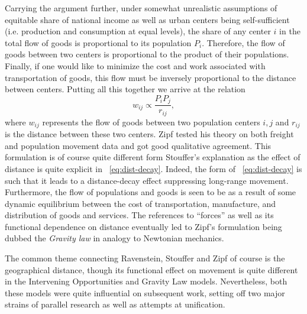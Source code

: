 Carrying the argument further, under somewhat unrealistic assumptions of equitable share of national income as well as urban centers being self-sufficient (i.e. production and consumption at equal levels), the share of any center $i$ in the total flow of goods is proportional to its population $P_i$. Therefore, the flow of goods between two centers is proportional to the product of their populations. Finally, if one would like to minimize the cost and work associated with transportation of goods, this flow must be inversely proportional to the distance between centers. Putting all this together we arrive at the relation
%
\begin{equation}
w_{ij} \propto \frac{P_i P_j}{r_{ij}},
\label{eq:dist-decay}
\end{equation}
%
where $w_{ij}$ represents the flow of goods between two population centers $i,j$ and $r_{ij}$ is the distance between these two centers. Zipf tested his theory on both freight and population movement data and got good qualitative agreement. This formulation is of course quite different form Stouffer's explanation as the effect of distance is quite explicit in \equationname~\eqref{eq:dist-decay}. Indeed, the form of \equationname~\eqref{eq:dist-decay} is such that it leads to a distance-decay effect suppressing long-range movement. Furthermore, the flow of populations and goods is seen to be as a result of some dynamic equilibrium between the cost of transportation, manufacture, and distribution of goods and services. The references to ``forces'' as well as its functional dependence on distance eventually led to Zipf's formulation being dubbed the \emph{Gravity law} in analogy to Newtonian mechanics.

The common theme connecting Ravenstein, Stouffer and Zipf of course is the geographical distance, though its functional effect on movement is quite different in the Intervening Opportunities and Gravity Law models. Nevertheless, both these models were quite influential on subsequent work, setting off two major strains of parallel research as well as attempts at unification.\\ 

